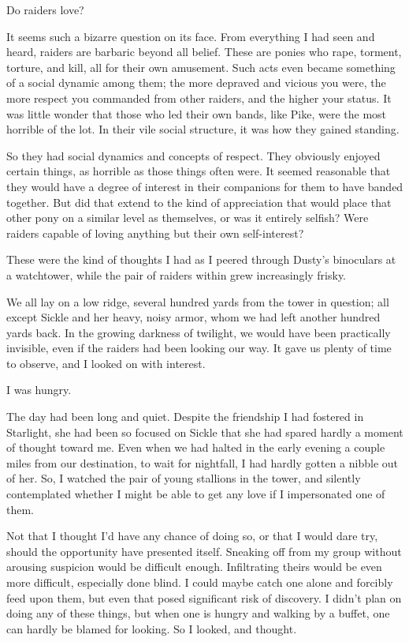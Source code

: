 Do raiders love?

It seems such a bizarre question on its face. From everything I had seen and heard, raiders are barbaric beyond all belief. These are ponies who rape, torment, torture, and kill, all for their own amusement. Such acts even became something of a social dynamic among them; the more depraved and vicious you were, the more respect you commanded from other raiders, and the higher your status. It was little wonder that those who led their own bands, like Pike, were the most horrible of the lot. In their vile social structure, it was how they gained standing.

So they had social dynamics and concepts of respect. They obviously enjoyed certain things, as horrible as those things often were. It seemed reasonable that they would have a degree of interest in their companions for them to have banded together. But did that extend to the kind of appreciation that would place that other pony on a similar level as themselves, or was it entirely selfish? Were raiders capable of loving anything but their own self-interest?

These were the kind of thoughts I had as I peered through Dusty’s binoculars at a watchtower, while the pair of raiders within grew increasingly frisky.

We all lay on a low ridge, several hundred yards from the tower in question; all except Sickle and her heavy, noisy armor, whom we had left another hundred yards back. In the growing darkness of twilight, we would have been practically invisible, even if the raiders had been looking our way. It gave us plenty of time to observe, and I looked on with interest.

I was hungry.

The day had been long and quiet. Despite the friendship I had fostered in Starlight, she had been so focused on Sickle that she had spared hardly a moment of thought toward me. Even when we had halted in the early evening a couple miles from our destination, to wait for nightfall, I had hardly gotten a nibble out of her. So, I watched the pair of young stallions in the tower, and silently contemplated whether I might be able to get any love if I impersonated one of them.

Not that I thought I’d have any chance of doing so, or that I would dare try, should the opportunity have presented itself. Sneaking off from my group without arousing suspicion would be difficult enough. Infiltrating theirs would be even more difficult, especially done blind. I could maybe catch one alone and forcibly feed upon them, but even that posed significant risk of discovery. I didn’t plan on doing any of these things, but when one is hungry and walking by a buffet, one can hardly be blamed for looking. So I looked, and thought.

